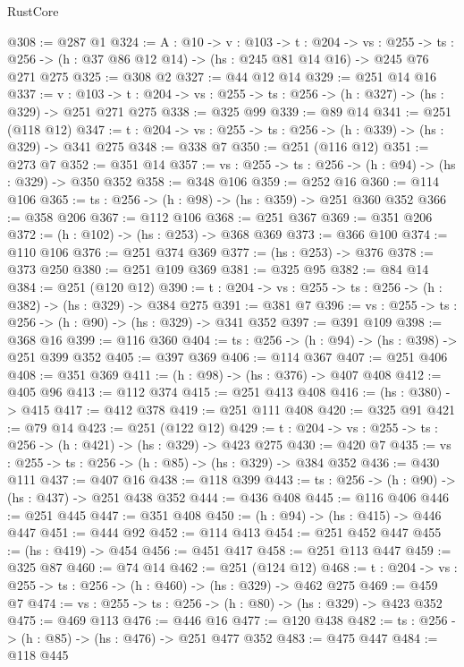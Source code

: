 \begin{lexlean}{RustCore}
\begin{coremodule}
@308 := @287 @1
@324 := {A : @10} ->
  {v : @103} ->
  {t : @204} ->
  {vs : @255} ->
  {ts : @256} -> (h : @37 @86 @12 @14) -> (hs : @245 @81 @14 @16) -> @245 @76 @271 @275
@325 := @308 @2
@327 := @44 @12 @14
@329 := @251 @14 @16
@337 := {v : @103} ->
  {t : @204} -> {vs : @255} -> {ts : @256} -> (h : @327) -> (hs : @329) -> @251 @271 @275
@338 := @325 @99
@339 := @89 @14
@341 := @251 (@118 @12)
@347 := {t : @204} -> {vs : @255} -> {ts : @256} -> (h : @339) -> (hs : @329) -> @341 @275
@348 := @338 @7
@350 := @251 (@116 @12)
@351 := @273 @7
@352 := @351 @14
@357 := {vs : @255} -> {ts : @256} -> (h : @94) -> (hs : @329) -> @350 @352
@358 := @348 @106
@359 := @252 @16
@360 := @114 @106
@365 := {ts : @256} -> (h : @98) -> (hs : @359) -> @251 @360 @352
@366 := @358 @206
@367 := @112 @106
@368 := @251 @367
@369 := @351 @206
@372 := (h : @102) -> (hs : @253) -> @368 @369
@373 := @366 @100
@374 := @110 @106
@376 := @251 @374 @369
@377 := (hs : @253) -> @376
@378 := @373 @250
@380 := @251 @109 @369
@381 := @325 @95
@382 := @84 @14
@384 := @251 (@120 @12)
@390 := {t : @204} -> {vs : @255} -> {ts : @256} -> (h : @382) -> (hs : @329) -> @384 @275
@391 := @381 @7
@396 := {vs : @255} -> {ts : @256} -> (h : @90) -> (hs : @329) -> @341 @352
@397 := @391 @109
@398 := @368 @16
@399 := @116 @360
@404 := {ts : @256} -> (h : @94) -> (hs : @398) -> @251 @399 @352
@405 := @397 @369
@406 := @114 @367
@407 := @251 @406
@408 := @351 @369
@411 := (h : @98) -> (hs : @376) -> @407 @408
@412 := @405 @96
@413 := @112 @374
@415 := @251 @413 @408
@416 := (hs : @380) -> @415
@417 := @412 @378
@419 := @251 @111 @408
@420 := @325 @91
@421 := @79 @14
@423 := @251 (@122 @12)
@429 := {t : @204} -> {vs : @255} -> {ts : @256} -> (h : @421) -> (hs : @329) -> @423 @275
@430 := @420 @7
@435 := {vs : @255} -> {ts : @256} -> (h : @85) -> (hs : @329) -> @384 @352
@436 := @430 @111
@437 := @407 @16
@438 := @118 @399
@443 := {ts : @256} -> (h : @90) -> (hs : @437) -> @251 @438 @352
@444 := @436 @408
@445 := @116 @406
@446 := @251 @445
@447 := @351 @408
@450 := (h : @94) -> (hs : @415) -> @446 @447
@451 := @444 @92
@452 := @114 @413
@454 := @251 @452 @447
@455 := (hs : @419) -> @454
@456 := @451 @417
@458 := @251 @113 @447
@459 := @325 @87
@460 := @74 @14
@462 := @251 (@124 @12)
@468 := {t : @204} -> {vs : @255} -> {ts : @256} -> (h : @460) -> (hs : @329) -> @462 @275
@469 := @459 @7
@474 := {vs : @255} -> {ts : @256} -> (h : @80) -> (hs : @329) -> @423 @352
@475 := @469 @113
@476 := @446 @16
@477 := @120 @438
@482 := {ts : @256} -> (h : @85) -> (hs : @476) -> @251 @477 @352
@483 := @475 @447
@484 := @118 @445

\end{coremodule}
\end{lexlean}
